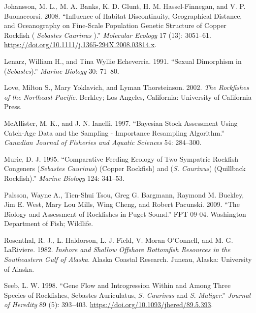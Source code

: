 \documentclass[11pt,
  english,
  a4paper,
]{article}
\begin{document}
\leavevmode\hypertarget{ref-johansson_influence_2008}{}%
Johansson, M. L., M. A. Banks, K. D. Glunt, H. M. Hassel-Finnegan, and V. P. Buonaccorsi. 2008. ``Influence of Habitat Discontinuity, Geographical Distance, and Oceanography on Fine-Scale Population Genetic Structure of Copper Rockfish ( \emph{Sebastes Caurinus} ).'' \emph{Molecular Ecology} 17 (13): 3051--61. \url{https://doi.org/10.1111/j.1365-294X.2008.03814.x}.

\leavevmode\hypertarget{ref-LenarzandEcheverria_dimorphism_1991}{}%
Lenarz, William H., and Tina Wyllie Echeverria. 1991. ``Sexual Dimorphism in (\emph{Sebastes}).'' \emph{Marine Biology} 30: 71--80.

\leavevmode\hypertarget{ref-loveetal_2002}{}%
Love, Milton S., Mary Yoklavich, and Lyman Thorsteinson. 2002. \emph{The Rockfishes of the Northeast Pacific}. Berkley; Los Angeles, California: University of California Press.

\leavevmode\hypertarget{ref-mcallister_bayesian_1997}{}%
McAllister, M. K., and J. N. Ianelli. 1997. ``Bayesian Stock Assessment Using Catch-Age Data and the Sampling - Importance Resampling Algorithm.'' \emph{Canadian Journal of Fisheries and Aquatic Sciences} 54: 284--300.

\leavevmode\hypertarget{ref-Murie_diet_1995}{}%
Murie, D. J. 1995. ``Comparative Feeding Ecology of Two Sympatric Rockfish Congeners (\emph{Sebastes Caurinus}) (Copper Rockfish) and (\emph{S. Caurinus}) (Quillback Rockfish).'' \emph{Marine Biology} 124: 341--53.

\leavevmode\hypertarget{ref-Palssonetal_2009}{}%
Palsson, Wayne A., Tien-Shui Tsou, Greg G. Bargmann, Raymond M. Buckley, Jim E. West, Mary Lou Mills, Wing Cheng, and Robert Pacunski. 2009. ``The Biology and Assessment of Rockfishes in Puget Sound.'' FPT 09-04. Washington Department of Fish; Wildlife.

\leavevmode\hypertarget{ref-Rosenthaletal_maturity_1982}{}%
Rosenthal, R. J., L. Haldorson, L. J. Field, V. Moran-O'Connell, and M. G. LaRiviere. 1982. \emph{Inshore and Shallow Offshore Bottomfish Resources in the Southeastern Gulf of Alaska}. Alaska Coastal Research. Juneau, Alaska: University of Alaska.

\leavevmode\hypertarget{ref-seeb_gene_1998}{}%
Seeb, L. W. 1998. ``Gene Flow and Introgression Within and Among Three Species of Rockfishes, Sebastes Auriculatus, \emph{S. Caurinus} and \emph{S. Maliger}.'' \emph{Journal of Heredity} 89 (5): 393--403. \url{https://doi.org/10.1093/jhered/89.5.393}.
\end{document}
